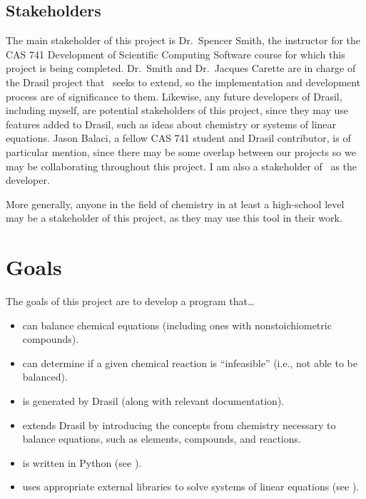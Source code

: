 \documentclass{article}
\begin{document}
\subsection{Stakeholders} \label{stkhlds}
The main stakeholder of this project is Dr.~Spencer Smith, the instructor for
the CAS 741 Development of Scientific Computing Software course for which this
project is being completed. Dr.~Smith and Dr.~Jacques Carette are in charge of
the Drasil project that \progname~seeks to extend, so the implementation and
development process are of significance to them. Likewise, any future
developers of Drasil, including myself, are
potential stakeholders of this project, since they may use features added to
Drasil, such as ideas about chemistry or systems of linear equations. Jason
Balaci, a fellow CAS 741 student and Drasil contributor, is of particular
mention, since
there may be some overlap between our projects so we may be collaborating
throughout this project. I am also a stakeholder of \progname~as the
developer.

More generally, anyone in the field of chemistry in at least a high-school level
may be a stakeholder of this project, as they may use this tool in their work.

\section{Goals}

The goals of this project are to develop a program that\dots

\begin{itemize}
	\item can balance chemical equations (including ones with nonstoichiometric
	      compounds).
	\item can determine if a given chemical reaction is ``infeasible'' (i.e.,
	      not able to be balanced).
	\item is generated by Drasil (along with relevant documentation).
	\item extends Drasil by introducing the concepts from chemistry necessary
	      to balance equations, such as elements, compounds, and reactions.
	\item is written in Python (see ).
	\item uses appropriate external libraries to
	      solve systems of linear equations (see \cite[Ch. 4]{chen_solving_2022}).
\end{itemize}

\newpage
\end{document}
